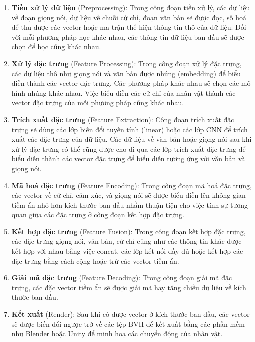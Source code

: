 \begin{enumerate}[label=\textbf{\arabic*.}]
	\item \textbf{Tiền xử lý dữ liệu} (Preprocessing): Trong công đoạn tiền xử lý, các dữ liệu về đoạn giọng nói, dữ liệu về chuỗi cử chỉ, đoạn văn bản sẽ được đọc, số hoá để thu được các vector hoặc ma trận thể hiện thông tin thô của dữ liệu. Đối với mỗi phương pháp học khác nhau, các thông tin dữ liệu ban đầu sẽ được chọn để học cũng khác nhau.
	
	\item \textbf{Xử lý đặc trưng} (Feature Processing): Trong công đoạn xử lý đặc trưng, các dữ liệu thô như giọng nói và văn bản được nhúng (embedding) để biểu diễn thành các vector đặc trưng. Các phương pháp khác nhau sẽ chọn các mô hình nhúng khác nhau. Việc biểu diễn các cử chỉ của nhân vật thành các vector đặc trưng của mỗi phương pháp cũng khác nhau.
	
	\item \textbf{Trích xuất đặc trưng} (Feature Extraction): Công đoạn trích xuất đặc trưng sẽ dùng các lớp biến đổi tuyến tính (linear) hoặc các lớp CNN để trích xuất các đặc trưng của dữ liệu. Các dữ liệu về văn bản hoặc giọng nói sau khi xử lý đặc trưng có thể cũng được cho đi qua các lớp trích xuất đặc trưng để biểu diễn thành các vector đặc trưng để biểu diễn tương ứng với văn bản và giọng nói.
	
	\item \textbf{Mã hoá đặc trưng} (Feature Encoding): Trong công đoạn mã hoá đặc trưng, các vector về cử chỉ, cảm xúc, và giọng nói sẽ được biểu diễn lên không gian tiềm ẩn nhỏ hơn kích thước ban đầu nhằm thuận tiện cho việc tính sự tương quan giữa các đặc trưng ở công đoạn kết hợp đặc trưng.
	
	\item \textbf{Kết hợp đặc trưng} (Feature Fusion): Trong công đoạn kết hợp đặc trưng, các đặc trưng giọng nói, văn bản, cử chỉ cũng như các thông tin khác được kết hợp với nhau bằng việc concat, các lớp kết nối đầy đủ hoặc kết hợp các đặc trưng bằng cách cộng hoặc trừ các vector tiềm ẩn.
	
	\item \textbf{Giải mã đặc trưng} (Feature Decoding): Trong công đoạn giải mã đặc trưng, các đặc vector tiềm ẩn sẽ được giải mã hay tăng chiều dữ liệu về kích thước ban đầu.
	
	\item \textbf{Kết xuất} (Render): Sau khi có được vector ở kích thước ban đầu, các vector sẽ được biến đổi ngược trở về các tệp BVH để kết xuất bằng các phần mềm như Blender hoặc Unity để minh hoạ các chuyển động của nhân vật.
\end{enumerate}

